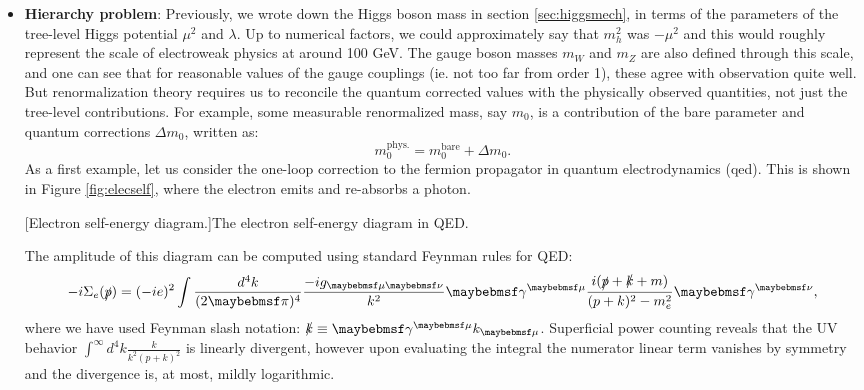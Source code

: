 \begin{itemize}
\item \textbf{Hierarchy problem}:
Previously, we wrote down the Higgs boson mass in section \ref{sec:higgsmech}, in terms of the parameters of the tree-level Higgs potential $\mu^2$ and $\lambda$. Up to numerical factors, we could approximately say that $m^2_{h}$ was $-\mu^2$ and this would roughly represent the scale of electroweak physics at around 100 GeV. The gauge boson masses $m_W$ and $m_Z$ are also defined through this scale, and one can see that for reasonable values of the gauge couplings (ie. not too far from order 1), these agree with observation quite well. But renormalization theory requires us to reconcile the quantum corrected values with the physically observed quantities, not just the tree-level contributions. For example, some measurable renormalized mass, say $m_0$, is a contribution of the bare parameter and quantum corrections $\Delta m_0$, written as:
\begin{equation}
m^{\text{phys.}}_0=m^{\text{bare}}_0+\Delta m_0.
\end{equation}
As a first example, let us consider the one-loop correction to the fermion propagator in quantum electrodynamics (\acrshort{qed}). This is shown in Figure \ref{fig:elecself}, where the electron emits and re-absorbs a photon.
\begin{center}
\vspace{5mm}
[Electron self-energy diagram.]{The electron self-energy diagram in QED.}
\label{fig:elecself}
\end{center}
The amplitude of this diagram can be computed using standard Feynman rules for QED:
\begin{equation}
-i\Sigma_{e}(\slashed{p})=(-ie)^2\int \frac{d^4 k}{(2\pi)^4}\frac{-ig_{\mu \nu}}{k^2}\gamma^{\mu}\frac{i(\slashed{p}+\slashed{k}+m)}{(p+k)^2-m^2_e}\gamma^{\nu},
\end{equation}
where we have used Feynman slash notation: $\slashed{k}\equiv \gamma^{\mu}k_{\mu}$. Superficial power counting reveals that the UV behavior $\int^{\infty} d^{4}k \frac{k}{k^2(p+k)^2}$ is linearly divergent, however upon evaluating the integral the numerator linear term vanishes by symmetry \cite{RN517} and the divergence is, at most, mildly logarithmic.


\end{itemize}
